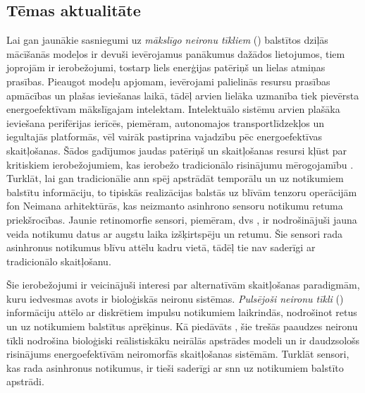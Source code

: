 
\subsection{Tēmas aktualitāte}
%

Lai gan jaunākie sasniegumi uz \textit{mākslīgo neironu tīkliem} () balstītos dziļās mācīšanās
modeļos ir devuši ievērojamus panākumus dažādos lietojumos, tiem joprojām ir ierobežojumi, tostarp liels enerģijas
patēriņš un lielas atmiņas prasības. Pieaugot modeļu apjomam, ievērojami palielinās resursu prasības apmācības un plašas
ieviešanas laikā, tādēļ arvien lielāka uzmanība tiek pievērsta energoefektīvam mākslīgajam intelektam. Intelektuālo sistēmu
arvien plašāka ieviešana perifērijas ierīcēs, piemēram, autonomajos transportlīdzekļos un iegultajās platformās, vēl vairāk
pastiprina vajadzību pēc energoefektīvas skaitļošanas. Šādos gadījumos jaudas patēriņš un skaitļošanas resursi kļūst par
kritiskiem ierobežojumiem, kas ierobežo tradicionālo risinājumu mērogojamību \cite{lin2018}. Turklāt, lai gan tradicionālie
\Gls{ann} spēj apstrādāt temporālu un uz notikumiem balstītu informāciju, to tipiskās realizācijas balstās uz blīvām tenzoru
operācijām fon Neimana arhitektūrās, kas neizmanto asinhrono sensoru notikumu retuma priekšrocības. Jaunie retinomorfie
sensori, piemēram, \Gls{dvs} \cite{delbruck2008}, ir nodrošinājuši jauna veida notikumu datus ar augstu laika izšķirtspēju un
retumu. Šie sensori rada asinhronus notikumus blīvu attēlu kadru vietā, tādēļ tie nav saderīgi ar tradicionālo skaitļošanu.

Šie ierobežojumi ir veicinājuši interesi par alternatīvām skaitļošanas paradigmām, kuru iedvesmas avots ir bioloģiskās
neironu sistēmas. \textit{Pulsējoši neironu tīkli} () informāciju attēlo ar diskrētiem impulsu notikumiem laikrindās, nodrošinot retus un uz
notikumiem balstītus aprēķinus. Kā piedāvāts \cite{maass1997}, šie trešās paaudzes neironu tīkli nodrošina bioloģiski
reālistiskāku neirālās apstrādes modeli un ir daudzsološs risinājums energoefektīvām neiromorfās skaitļošanas sistēmām.
Turklāt sensori, kas rada asinhronus notikumus, ir tieši saderīgi ar \Gls{snn} uz notikumiem balstīto apstrādi.

